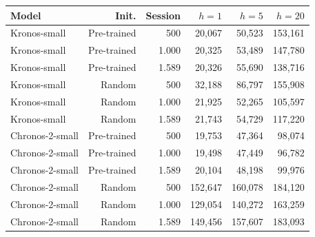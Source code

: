 \begin{tabular}{@{}lrrrrr@{}}
\toprule
Model & Init. & Session & $h=1$ & $h=5$ & $h=20$ \\
\midrule
Kronos-small & Pre-trained & 500 & 20,067 & 50,523 & 153,161 \\
Kronos-small & Pre-trained & 1.000 & 20,325 & 53,489 & 147,780 \\
Kronos-small & Pre-trained & 1.589 & 20,326 & 55,690 & 138,716 \\
Kronos-small & Random & 500 & 32,188 & 86,797 & 155,908 \\
Kronos-small & Random & 1.000 & 21,925 & 52,265 & 105,597 \\
Kronos-small & Random & 1.589 & 21,743 & 54,729 & 117,220 \\
\midrule
Chronos-2-small & Pre-trained & 500 & 19,753 & 47,364 & 98,074 \\
Chronos-2-small & Pre-trained & 1.000 & 19,498 & 47,449 & 96,782 \\
Chronos-2-small & Pre-trained & 1.589 & 20,104 & 48,198 & 99,976 \\
Chronos-2-small & Random & 500 & 152,647 & 160,078 & 184,120 \\
Chronos-2-small & Random & 1.000 & 129,054 & 140,272 & 163,259 \\
Chronos-2-small & Random & 1.589 & 149,456 & 157,607 & 183,093 \\
\bottomrule
\end{tabular}
